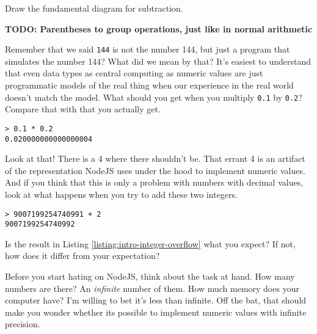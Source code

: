 \begin{question}
  Draw the fundamental diagram for subtraction.
\end{question}

\begin{center}
\textbf{TODO: Parentheses to group operations, just like in normal arithmetic}
\end{center}

Remember that we said \texttt{144} is not the number 144, but just a program
that simulates the number 144? What did we mean by that? It's easiest to
understand that even data types as central computing as numeric values are just
programmatic models of the real thing when our experience in the real world
doesn't match the model. What should you get when you multiply \texttt{0.1} by
\texttt{0.2}? Compare that with that you actually get.

\begin{lstlisting}
> 0.1 * 0.2
0.020000000000000004
\end{lstlisting}

Look at that! There is a 4 where there shouldn't be. That errant 4 is an
artifact of the representation NodeJS uses under the hood to implement numeric
values. And if you think that this is only a problem with numbers with decimal
values, look at what happens when you try to add these two integers.

\begin{lstlisting}[caption={\label{listing:intro-integer-overflow} The
limitations of finite memory.}]
> 9007199254740991 + 2
9007199254740992
\end{lstlisting}

\begin{question}
Is the result in Listing \ref{listing:intro-integer-overflow} what you expect?
If not, how does it differ from your expectation?
\end{question}

Before you start hating on NodeJS, think about the task at hand. How many
numbers are there? An \emph{infinite} number of them. How much memory does your computer have? I'm
willing to bet it's less than infinite. Off the bat, that should make you wonder
whether its possible to implement numeric values with infinite precision.

